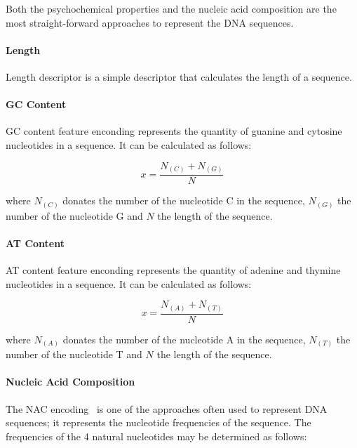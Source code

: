 Both the psychochemical properties and the nucleic acid composition are the most straight-forward approaches to represent the \gls{DNA} sequences. 

\paragraph{Length}

Length descriptor is a simple descriptor that calculates the length of a sequence.

\paragraph{GC Content}

\gls{GC} content feature enconding represents the quantity of guanine and cytosine nucleotides in a sequence. It can be calculated as follows:

\begin{equation}\label{eq:gc_content}
    x = \frac{N_{(C)} + N_{(G)}}{N}
\end{equation}


where $N_{(C)}$ donates the number of the nucleotide C in the sequence, $N_{(G)}$ the number of the nucleotide G and $N$ the length of the sequence.

\paragraph{AT Content}

\gls{AT} content feature enconding represents the quantity of adenine and thymine nucleotides in a sequence. It can be calculated as follows:


\begin{equation}\label{eq:at_content}
    x = \frac{N_{(A)} + N_{(T)}}{N}
\end{equation}

where $N_{(A)}$ donates the number of the nucleotide A in the sequence, $N_{(T)}$ the number of the nucleotide T and $N$ the length of the sequence.


\paragraph{Nucleic Acid Composition}

The \gls{NAC} encoding~\cite{Chen2015IRNA-Methyl:Composition,Chen2013IRSpot-PseDNC:Composition} is one of the approaches often used to represent \gls{DNA} sequences; it represents the nucleotide frequencies of the sequence. The frequencies of the 4 natural nucleotides may be determined as follows:


